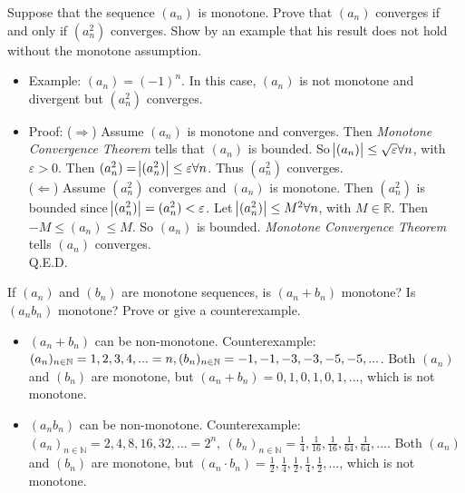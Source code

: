 \documentclass[]{exam}
\begin{document}
\begin{questions}
\question Suppose that the sequence $(a_n)$ is monotone. Prove that $(a_n)$ converges if and only if $(a_n^2)$ converges. Show by an example that his result does not hold without the monotone assumption.
	\begin{itemize}
		\item Example: $(a_n) = (-1) ^ n$. In this case, $(a_n)$ is not monotone and divergent but $(a_n^2)$ converges. 
		\item Proof: ($\Rightarrow$) Assume $(a_n)$ is monotone and converges. Then \textit{Monotone Convergence Theorem} tells that $(a_n)$ is bounded. So $\abs{(a_n)} \leq \sqrt{\varepsilon} \forall n$, with $\varepsilon > 0$. Then $(a_n^2) = \abs{(a_n^2)} \leq \varepsilon \forall n$. Thus $(a_n^2)$ converges.
		\\ ($\Leftarrow$) Assume $(a_n^2)$ converges and $(a_n)$ is monotone. Then $(a_n^2)$ is bounded since $\abs{(a_n^2)} = (a_n^2) < \varepsilon$. Let $\abs{(a_n^2)} \leq M^2 \forall n$, with $M\in\mathbb{R}$. Then $-M \leq (a_n) \leq M$. So $(a_n)$ is bounded. \textit{Monotone Convergence Theorem} tells $(a_n)$ converges.
		\\ Q.E.D.
	\end{itemize}

\question If $(a_n)$ and $(b_n)$ are monotone sequences, is $(a_n + b_n)$ monotone? Is $(a_nb_n)$ monotone? Prove or give a counterexample.
	\begin{itemize}
		\item $(a_n + b_n)$ can be non-monotone. Counterexample: $(a_n)_{n\in\mathbb{N}} = 1, 2, 3, 4,... = n,\\ (b_n)_{n\in\mathbb{N}} = -1, -1, -3, -3, -5, -5,...$. Both $(a_n)$ and $(b_n)$ are monotone, but $(a_n + b_n) = 0, 1, 0, 1, 0, 1,...$, which is not monotone. 
		\item $(a_nb_n)$ can be non-monotone. Counterexample: $(a_n)_{n\in\mathbb{N}} = 2, 4, 8, 16, 32,... = 2^n,\ (b_n)_{n\in\mathbb{N}} = \frac{1}{4}, \frac{1}{16}, \frac{1}{16}, \frac{1}{64}, \frac{1}{64},...$. Both $(a_n)$ and $(b_n)$ are monotone, but $(a_n \cdot b_n) = \frac{1}{2}, \frac{1}{4}, \frac{1}{2}, \frac{1}{4}, \frac{1}{2}, ...$, which is not monotone.
	\end{itemize}



\end{questions}
\end{document}
